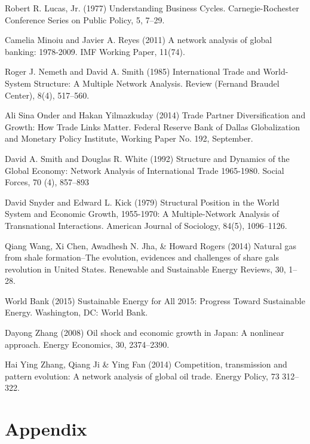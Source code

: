 \documentclass[10pt,letterpaper,pdftex]{article}
\begin{document}
\begin{thebibliography}{99}
Robert R. Lucas, Jr. (1977) Understanding Business Cycles. Carnegie-Rochester Conference Series on Public Policy, 5, 7--29. 

Camelia Minoiu and Javier A. Reyes (2011) A network analysis of global banking: 1978-2009. IMF Working Paper, 11(74).

Roger J. Nemeth and David A. Smith (1985) International Trade and World-System Structure: A Multiple Network Analysis. Review (Fernand Braudel Center), 8(4), 517--560.

Ali Sina Onder and Hakan Yilmazkuday (2014) Trade Partner Diversification and Growth: How Trade Links Matter. Federal Reserve Bank of Dallas Globalization and Monetary Policy Institute, Working Paper No. 192, September. 

David A. Smith and Douglas R. White (1992) Structure and Dynamics of the Global Economy: Network Analysis of International Trade 1965-1980. Social Forces, 70 (4), 857--893

David Snyder and Edward L. Kick (1979) Structural Position in the World System and Economic Growth, 1955-1970: A Multiple-Network Analysis of Transnational Interactions. American Journal of Sociology, 84(5), 1096--1126.

Qiang Wang, Xi Chen, Awadhesh N. Jha, \& Howard Rogers (2014) Natural gas from shale formation--The evolution, evidences and challenges of share gals revolution in United States. Renewable and Sustainable Energy Reviews, 30, 1--28.

World Bank (2015) Sustainable Energy for All 2015: Progress Toward Sustainable Energy. Washington, DC: World Bank.

Dayong Zhang (2008) Oil shock and economic growth in Japan: A nonlinear approach. Energy Economics, 30, 2374--2390.

Hai Ying Zhang, Qiang Ji \& Ying Fan (2014) Competition, transmission and pattern evolution: A network analysis of global oil trade. Energy Policy, 73 312--322.

\end{thebibliography} 


\newpage 
\setcounter{secnumdepth}{0}
\section{Appendix} \label{appendix}
\end{document}
